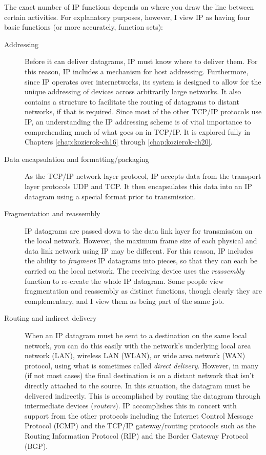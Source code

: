 \documentclass[b5paper,11pt]{memoir}
\begin{document}
The exact number of IP functions depends on where you draw the line between certain activities.
For explanatory purposes, however, I view IP as having four basic functions (or more accurately, function sets):
\begin{description}
   \item[Addressing]
      Before it can deliver datagrams, IP must know where to deliver them.
      For this reason, IP includes a mechanism for host addressing.
      Furthermore, since IP operates over internetworks, its system is designed to allow for the unique addressing of devices across arbitrarily large networks.
      It also contains a structure to facilitate the routing of datagrams to distant networks, if that is required.
      Since most of the other TCP/IP protocols use IP, an understanding the IP addressing scheme is of vital importance to comprehending much of what goes on in TCP/IP.
      It is explored fully in Chapters \vref{chap:kozierok-ch16} through \vref{chap:kozierok-ch20}.

   \item[Data encapsulation and formatting/packaging]
      As the TCP/IP network layer protocol, IP accepts data from the transport layer protocols UDP and TCP.
      It then encapsulates this data into an IP datagram using a special format prior to transmission.

   \item[Fragmentation and reassembly]
      IP datagrams are passed down to the data link layer for transmission on the local network.
      However, the maximum frame size of each physical and data link network using IP may be different.
      For this reason, IP includes the ability to {\emph{fragment}} IP datagrams into pieces, so that they can each be carried on the local network.
      The receiving device uses the {\emph{reassembly}} function to re-create the whole IP datagram.
      Some people view fragmentation and reassembly as distinct functions, though clearly they are complementary, and I view them as being part of the same job.

   \item[Routing and indirect delivery]
      When an IP datagram must be sent to a destination on the same local network, you can do this easily with the network's underlying local area network (LAN), wireless LAN (WLAN), or wide area network (WAN) protocol, using what is sometimes called {\emph{direct delivery}}.
      However, in many (if not most cases) the final destination is on a distant network that isn't directly attached to the source.
      In this situation, the datagram must be delivered indirectly.
      This is accomplished by routing the datagram through intermediate devices ({\emph{routers}}).
      \protect\hypertarget{ch15s02.htmlux5cux23idx-CHP-15-0641}{}{}IP accomplishes this in concert with support from the other protocols including the Internet Control Message Protocol (ICMP) and the TCP/IP gateway/routing protocols such as the Routing Information Protocol (RIP) and the Border Gateway Protocol (BGP).
\end{description}
\end{document}
